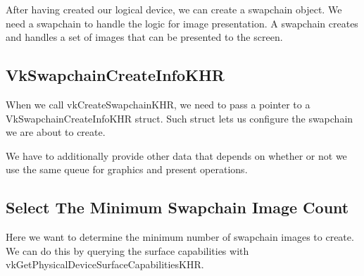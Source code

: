 After having created our logical device, we can create a swapchain object.
We need a swapchain to handle the logic for image presentation.
A swapchain creates and handles a set of images that can be presented to the screen.

\begin{minipage}{\linewidth}{\noindent}
    
\end{minipage}

\subsection{VkSwapchainCreateInfoKHR}

When we call vkCreateSwapchainKHR, we need to pass a pointer to a
VkSwapchainCreateInfoKHR struct.
Such struct lets us configure the swapchain we are about to create.

\begin{minipage}{\linewidth}{\noindent}
    
\end{minipage}

We have to additionally provide other data that depends on whether or not we use
the same queue for graphics and present operations.

\begin{minipage}{\linewidth}{\noindent}
    
\end{minipage}

\subsection{Select The Minimum Swapchain Image Count}

Here we want to determine the minimum number of swapchain images to create.
We can do this by querying the surface capabilities with
vkGetPhysicalDeviceSurfaceCapabilitiesKHR.

\begin{minipage}{\linewidth}{\noindent}
    
\end{minipage}

